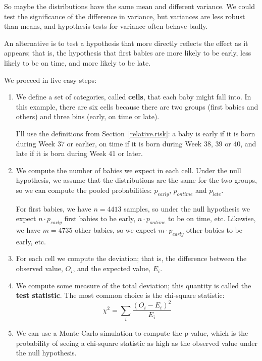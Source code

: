 \documentclass[12pt]{book}
\begin{document}

So maybe the distributions have the same mean and different variance.
We could test the significance of the difference in variance, but
variances are less robust than means, and hypothesis tests for
variance often behave badly.


An alternative is to test a hypothesis that more directly reflects the
effect as it appears; that is, the hypothesis that first babies are
more likely to be early, less likely to be on time, and more likely to
be late.

We proceed in five easy steps:

\begin{enumerate}

\item We define a set of categories, called {\bf cells}, that each
  baby might fall into.  In this example, there are six cells because
  there are two groups (first babies and others) and three bins
  (early, on time or late).


I'll use the definitions from Section~\ref{relative.risk}: a baby is
early if it is born during Week 37 or earlier, on time if it is born
during Week 38, 39 or 40, and late if it is born during Week 41 or
later.

\item We compute the number of babies we expect in each cell.  Under
  the null hypothesis, we assume that the distributions are the same
  for the two groups, so we can compute the pooled probabilities:
  $p_{early}$, $p_{ontime}$ and $p_{late}$.

For first babies, we have $n=4413$ samples, so under the null
hypothesis we expect $n \cdot p_{early}$ first babies to be early, $n
\cdot p_{ontime}$ to be on time, etc.  Likewise, we have $m=4735$
other babies, so we expect $m \cdot p_{early}$ other babies to be
early, etc.

\item For each cell we compute the deviation; that is, the difference
  between the observed value, $O_i$, and the expected value, $E_i$.


\item We compute some measure of the total deviation; this quantity
is called the {\bf test statistic}.  The most common
choice is the chi-square statistic:
%
  \[ \chi^2 = \sum_i \frac{(O_i - E_i)^2}{E_i} \]
%

\item We can use a Monte Carlo simulation to compute the p-value,
  which is the probability of seeing a chi-square statistic as high
  as the observed value under the null hypothesis.


\end{enumerate}
\end{document}
